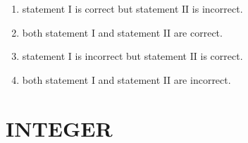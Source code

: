 \documentclass[journal]{IEEEtran}
\numberwithin{equation}{enumi}
\numberwithin{figure}{enumi}
\begin{document}
\begin{enumerate}
    \hfill{}

    \begin{enumerate}
        \item statement $\mathrm{I}$ is correct but statement $\mathrm{II}$ is incorrect. 
        \item both statement $\mathrm{I}$ and statement $\mathrm{II}$ are correct.
        \item statement $\mathrm{I}$ is incorrect but statement $\mathrm{II}$ is correct. 
        \item both statement $\mathrm{I}$ and statement $\mathrm{II}$ are incorrect.  
    \end{enumerate}
\end{enumerate}

\section*{INTEGER}
\end{document}
